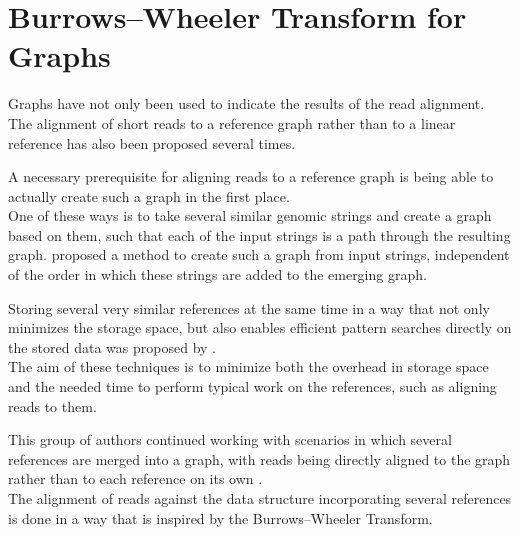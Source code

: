 \documentclass[a4paper,12pt,twoside,BCOR=10mm]{scrbook}
\begin{document}
\section{Burrows--Wheeler Transform for Graphs}

Graphs have not only been used to indicate the results of the read alignment.
The alignment of short reads to a reference graph rather than to a linear reference has
also been proposed several times.

A necessary prerequisite for aligning reads to a reference graph is
being able to actually create such a graph in the first place. \\
One of these ways is to take several similar genomic strings and create a graph based
on them, such that each of the input strings is a path through the resulting graph.
\citet{Lee2002} proposed a method to create such a graph from input strings,
independent of the order in which these strings
are added to the emerging graph.

Storing several very similar references at the same time in a way that not only minimizes
the storage space, but also enables efficient pattern searches directly on the
stored data was proposed by \citet{Makinen2010}. \\
The aim of these techniques is to
minimize both the overhead in storage space and the needed time to perform typical work
on the references, such as aligning reads to them.

This group of authors continued working with scenarios in which
several references are merged into a graph, with reads being directly
aligned to the graph rather than to each reference on its own \citep{Siren2014}. \\
The alignment of reads against the data structure incorporating several references
is done in a way that is inspired by the Burrows--Wheeler Transform. \\
\end{document}
